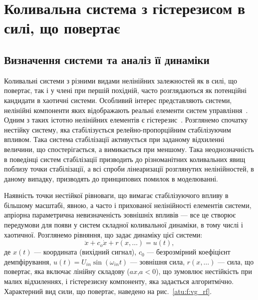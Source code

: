 
\FloatBarrier
\section{Коливальна система з гістерезисом в силі, що повертає} %
\label{atu:sect:vglass}


\subsection{Визначення системи та аналіз її динаміки} %

Коливальні системи з різними видами нелінійних залежностей
як в силі, що повертає, так і у члені при першій похідній,
часто розглядаються як потенційні кандидати в хаотичні
системи. Особливий інтерес представляють системи, нелінійні
компоненти яких відображають реальні елементи систем
управління~\cite{atu_st85,atu_ISDMCI2013,atu_asau20}. Одним з таких істотно
нелінійних елементів є гістерезис~\cite{sys_hyst, in_theory_mech_vibro,ivanov_alg_id_dyn_hyst, andronn_id_ns_hyst, mai_iss_dyn_isp}.
Розглянемо спочатку нестійку систему, яка стабілізується релейно-пропорційним стабілізуючим
впливом. Така система стабілізації активується при заданому
відхиленні величини, що спостерігається, а вимикається при
меншому. Така неоднозначність в поведінці систем стабілізації
призводить до різноманітних коливальних явищ поблизу
точки стабілізації, а всі спроби лінеаризації розглянутих
нелінійностей, в даному випадку, призводять до принципових
помилок в моделюванні.

Наявність точки нестійкої рівноваги, що вимагає стабілізуючого
впливу в більшому масштабі, явною, а часто і прихованої
нелінійності елементів системи, апріорна параметрична
невизначеність зовнішніх впливів --- все це створює передумови
для появи у систем складної коливальної динаміки, в тому числі
і хаотичної. Розглянемо рівняння, що задає динаміку цієї системи:
%
\begin{equation}
  \ddot{x} + c_o \dot{x} + r( x, \ldots ) = u(t),
  \label{atu:eq:vglass}
\end{equation}
%
де
$x(t)$ --- координата (вихідний сигнал),
$c_0$ --- безрозмірний коефіцієнт демпфірування,
$u(t) = U_{in} \sin (\omega_{in} t) $ --- зовнішня сила,
$r(x, \ldots) $ --- сила, що повертає, яка включає лінійну складову ($ax$,$ a <0 $),
що зумовлює нестійкість при малих
відхиленнях, і гістерезисну компоненту, яка задається
алгоритмічно. Характерний вид сили, що повертає, наведено на
рис.~\ref{atu:f:vg_rf}.

